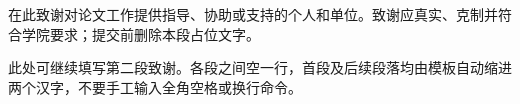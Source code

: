 \begin{acknowledgements}
在此致谢对论文工作提供指导、协助或支持的个人和单位。致谢应真实、克制并符合学院要求；提交前删除本段占位文字。

此处可继续填写第二段致谢。各段之间空一行，首段及后续段落均由模板自动缩进两个汉字，不要手工输入全角空格或换行命令。
\end{acknowledgements}
